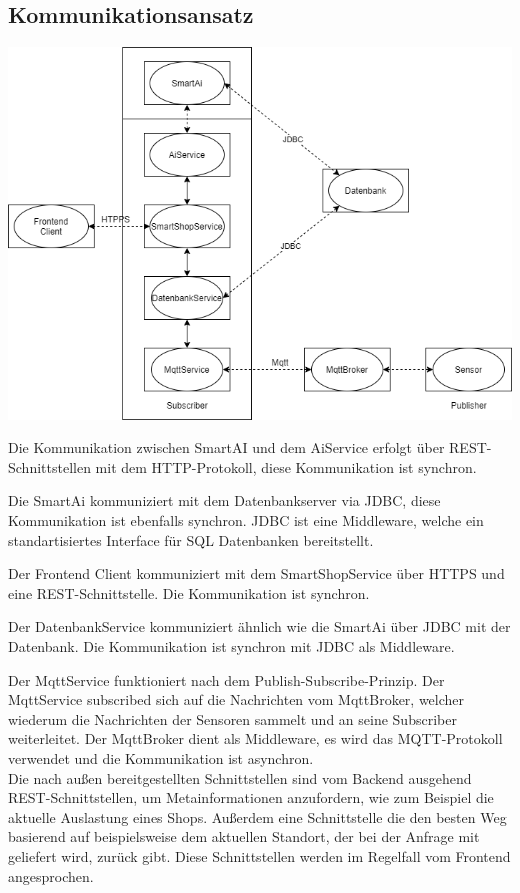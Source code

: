 \documentclass[runningheads]{llncs}
\begin{document}
\subsection{Kommunikationsansatz}
\includegraphics[width=\linewidth]{images/Kommunikation}

Die Kommunikation zwischen SmartAI und dem AiService erfolgt über REST-Schnittstellen mit dem HTTP-Protokoll, diese Kommunikation ist synchron.

Die SmartAi kommuniziert mit dem Datenbankserver via JDBC, diese Kommunikation ist ebenfalls synchron. JDBC ist eine Middleware, welche ein standartisiertes Interface für SQL Datenbanken bereitstellt.

Der Frontend Client kommuniziert mit dem SmartShopService über HTTPS und eine REST-Schnittstelle. Die Kommunikation ist synchron.

Der DatenbankService kommuniziert ähnlich wie die SmartAi über JDBC mit der Datenbank. Die Kommunikation ist synchron mit JDBC als Middleware.

Der MqttService funktioniert nach dem Publish-Subscribe-Prinzip. Der MqttService subscribed sich auf die Nachrichten vom MqttBroker, welcher wiederum die Nachrichten der Sensoren sammelt und an seine Subscriber weiterleitet.
Der MqttBroker dient als Middleware, es wird das MQTT-Protokoll verwendet und die Kommunikation ist asynchron. \\

Die nach außen bereitgestellten Schnittstellen sind vom Backend ausgehend REST-Schnittstellen, um Metainformationen anzufordern, wie zum Beispiel die aktuelle Auslastung eines Shops.
Außerdem eine Schnittstelle die den besten Weg basierend auf beispielsweise dem aktuellen Standort, der bei der Anfrage mit geliefert wird, zurück gibt.
Diese Schnittstellen werden im Regelfall vom Frontend angesprochen.
\end{document}
